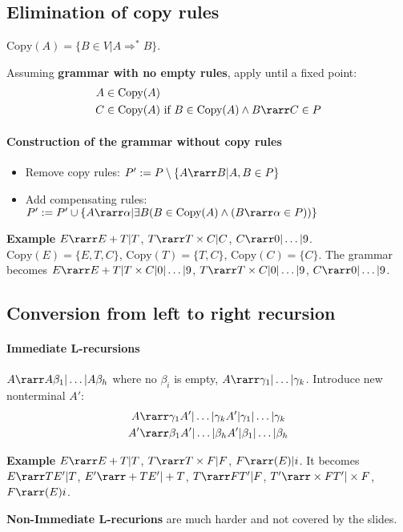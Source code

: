 \subsection{Elimination of copy rules}
$\text{Copy}(A) = \{ B \in V | A \Rightarrow^* B \}$.

Assuming \textbf{grammar with no empty rules}, apply until a fixed point:
\begin{align*}
    A &\in \text{Copy}(A) \\
    C &\in \text{Copy}(A) \text{ if } B \in \text{Copy}(A) \land B \rarr C \in P
\end{align*}

\paragraph{Construction of the grammar without copy rules}

\begin{itemize}
    \item Remove copy rules: $P' := P \setminus \{A\rarr B | A, B \in P\}$
    \item Add compensating rules: $P' := P' \cup \{ A \rarr \alpha | \exists B (B \in \text{Copy}(A) \land (B \rarr \alpha \in P)) \}$
\end{itemize}

\textbf{Example} $E \rarr E + T | T$, $T \rarr T \times C | C$, $C \rarr 0|\ldots|9$.
$\text{Copy}(E)=\{E,T,C\}$, $\text{Copy}(T) = \{T, C\}$, $\text{Copy}(C) = \{C\}$.
The grammar becomes $E \rarr E+T|T\times C|0|\ldots|9$, $T \rarr T\times C|0|\ldots|9$, $C \rarr 0|\ldots|9$.

\subsection{Conversion from left to right recursion}

\paragraph{Immediate L-recursions} $A \rarr A\beta_1 | \ldots | A\beta_h$ where no $\beta_i$ is empty, $A \rarr \gamma_1 | \ldots | \gamma_k$. Introduce new nonterminal $A'$:
\begin{align*}
    A &\rarr \gamma_1A' | \ldots | \gamma_kA' | \gamma_1 | \ldots | \gamma_k \\
    A' &\rarr \beta_1A' | \ldots | \beta_hA' | \beta_1 | \ldots | \beta_h
\end{align*}

\textbf{Example} $E \rarr E+T | T$, $T \rarr T\times F | F$, $F \rarr (E) | i$. It becomes $E \rarr TE' | T$, $E' \rarr +TE'|+T$, $T \rarr FT'|F$, $T' \rarr \times FT'|\times F$, $F\rarr (E)i$.

\textbf{Non-Immediate L-recurions} are much harder and not covered by the slides.

